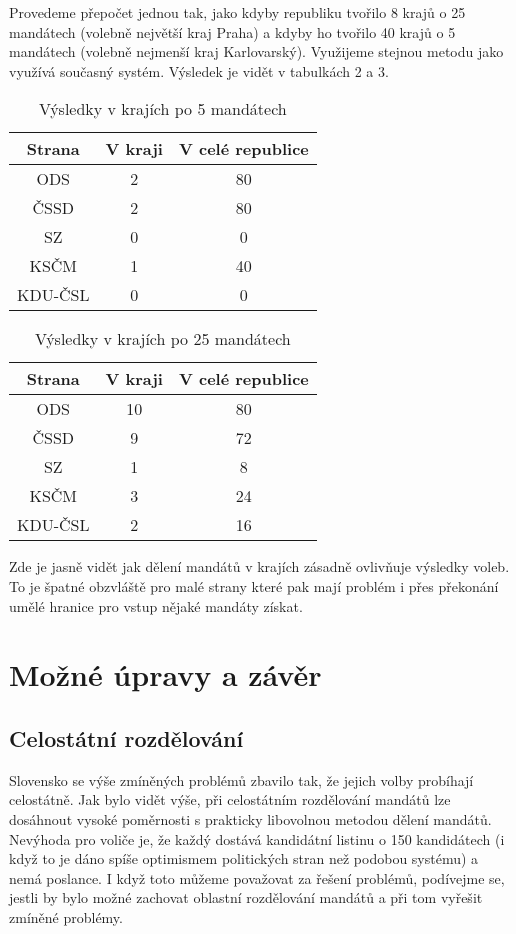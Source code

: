 \documentclass[12pt]{report}
\begin{document}
Provedeme přepočet jednou tak, jako kdyby republiku tvořilo 8 krajů o 25 mandátech (volebně největší kraj Praha) a kdyby ho tvořilo 40 krajů o 5 mandátech (volebně nejmenší kraj Karlovarský).
Využijeme stejnou metodu jako využívá současný systém.
Výsledek je vidět v tabulkách 2 a 3.
\begin{table} \begin{center} \begin{tabular}{|c|c|c|} \hline Strana & V kraji & V celé republice\\
\hline ODS & 2 & 80\\
\hline ČSSD & 2 & 80\\
\hline SZ & 0 & 0\\
\hline KSČM & 1 & 40\\
\hline KDU-ČSL & 0 & 0\\
\hline \end{tabular} \caption{Výsledky v krajích po 5 mandátech} \end{center} \end{table} \begin{table} \begin{center} \begin{tabular}{|c|c|c|} \hline Strana & V kraji & V celé republice\\
\hline ODS & 10 & 80\\
\hline ČSSD & 9 & 72\\
\hline SZ & 1 & 8\\
\hline KSČM & 3 & 24\\
\hline KDU-ČSL & 2 & 16\\
\hline \end{tabular} \caption{Výsledky v krajích po 25 mandátech} \end{center} \end{table} Zde je jasně vidět jak dělení mandátů v krajích zásadně ovlivňuje výsledky voleb.
To je špatné obzvláště pro malé strany které pak mají problém i přes překonání umělé hranice pro vstup nějaké mandáty získat.
\chapter{Možné úpravy a závěr}
\section{Celostátní rozdělování}
Slovensko se výše zmíněných problémů zbavilo tak, že jejich volby probíhají celostátně.
Jak bylo vidět výše, při celostátním rozdělování mandátů lze dosáhnout vysoké poměrnosti s prakticky libovolnou metodou dělení mandátů.
Nevýhoda pro voliče je, že každý dostává kandidátní listinu o 150 kandidátech (i když to je dáno spíše optimismem politických stran než podobou systému) a nemá  poslance.
I když toto můžeme považovat za řešení problémů, podívejme se, jestli by bylo možné zachovat oblastní rozdělování mandátů a při tom vyřešit zmíněné problémy.
\end{document}
